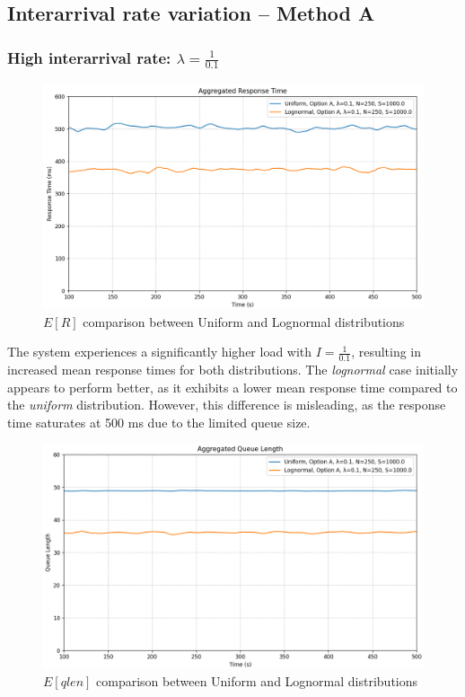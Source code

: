 \documentclass{report}
\begin{document}
\subsection{Interarrival rate variation -- Method A}

\subsubsection*{High interarrival rate: $\lambda = \frac{1}{0.1}$}

\begin{figure}[H]
    \centering
    \includegraphics[width=\textwidth]{img/plots/I-vary/R_A_I01.png}
    \caption{$E[R]$ comparison between Uniform and Lognormal distributions}
\end{figure}

The system experiences a significantly higher load with $I = \frac{1}{0.1}$, resulting in increased mean response times for both distributions. The \emph{lognormal} case initially appears to perform better, as it exhibits a lower mean response time compared to the \emph{uniform} distribution. 
However, this difference is misleading, as the response time saturates at 500 ms due to the limited queue size.

\begin{figure}[H]
    \centering
    \includegraphics[width=\textwidth]{img/plots/I-vary/Q_A_I01.png}
    \caption{$E[qlen]$ comparison between Uniform and Lognormal distributions}
\end{figure}
\end{document}
